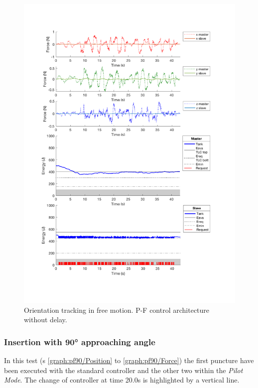 \begin{center}
	\begin{figure}
		\includegraphics[width=\textwidth, keepaspectratio]{plots/pfFree/Force.pdf}
		\caption{Orientation tracking in free motion. P-F control architecture without delay.}
		\label{graph:pfFree/Force}
	\end{figure}
\end{center}
\newpage
\subsubsection{Insertion with 90° approaching angle}
In this test  (\figurename s{ \ref{graph:pf90/Position} to \ref{graph:pf90/Force}}) the first puncture have been executed with the standard controller and the other two within the \textit{Pilot Mode}.
The change of controller at time 20.0s is highlighted by a vertical line.

